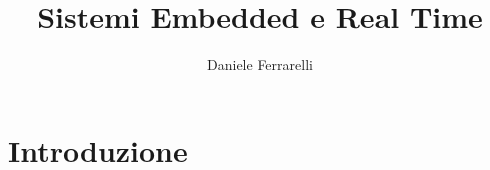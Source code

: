 \documentclass[]{article}
\title{Sistemi Embedded e Real Time}
\author{Daniele Ferrarelli}
\date{}
\begin{document}
\maketitle

\section{Introduzione}
\end{document}

